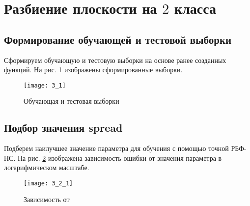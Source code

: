 \section{Разбиение плоскости на $2$ класса}

\subsection{Формирование обучающей и тестовой выборки}


Сформируем обучающую и тестовую выборки на основе ранее созданных функций. На рис. \ref{fig:3_1} изображены сформированные выборки.
\begin{figure}[H]
\begin{center}
	\texttt{[image: 3\_1]}
	\caption{Обучающая и тестовая выборки}
	\label{fig:3_1}
\end{center}
\end{figure}

\subsection{Подбор значения spread}


Подберем наилучшее значение параметра  для обучения с помощью точной РБФ-НС. На рис. \ref{fig:3_2_1} изображена зависимость ошибки  от значения параметра  в логарифмическом масштабе. 
\begin{figure}[H]
\begin{center}
	\texttt{[image: 3\_2\_1]}
	\caption{Зависимость  от }
	\label{fig:3_2_1}
\end{center}
\end{figure}

